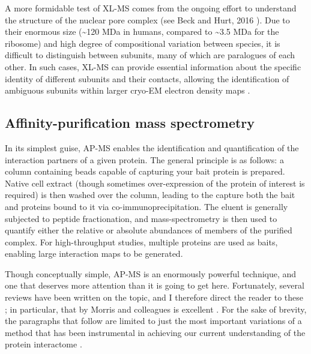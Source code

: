 \documentclass[a4paper,11pt,twoside,openright]{scrbook}
\begin{document}
A more formidable test of XL-MS comes from the ongoing effort to understand the
structure of the nuclear pore complex (see Beck and Hurt, 2016 \cite{Beck2016}).
Due to their enormous size (\textasciitilde 120 MDa in humans, compared to
\textasciitilde 3.5 MDa for the ribosome) and high degree of compositional
variation between species, it is difficult to distinguish between subunits, many
of which are paralogues of each other. In such cases, XL-MS can provide
essential information about the specific identity of different subunits and
their contacts, allowing the identification of ambiguous subunits within larger
cryo-EM electron density maps \cite{Bui2013,Shi2014a}.

\subsection{Affinity-purification mass spectrometry}
In its simplest guise, AP-MS enables the identification and quantification of
the interaction partners of a given protein. The general principle is as
follows: a column containing beads capable of capturing your bait protein is
prepared. Native cell extract (though sometimes over-expression of the protein
of interest is required) is then washed over the column, leading to the capture
both the bait and proteins bound to it via co-immunoprecipitation. The eluent is
generally subjected to peptide fractionation, and mass-spectrometry is then used
to quantify either the relative or absolute abundances of members of the
purified complex. For high-throughput studies, multiple proteins are used as
baits, enabling large interaction maps to be generated.

Though conceptually simple, AP-MS is an enormously powerful technique, and one
that deserves more attention than it is going to get here. Fortunately, several
reviews have been written on the topic, and I therefore direct the reader to
these \cite{Oeffinger2012,Morris2014,Aebersold2016}; in particular, that by
Morris and colleagues is excellent \cite{Morris2014}. For the sake of brevity,
the paragraphs that follow are limited to just the most important variations of
a method that has been instrumental in achieving our current understanding of
the protein interactome \cite{Malovannaya2011,Hein2015,Huttlin2015,Wan2015}.
\end{document}
